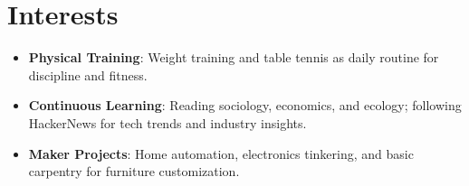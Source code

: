 \documentclass[letterpaper,11pt]{article}
\newcommand{\resumeItem}[2]{
  \item\small{
    \textbf{#1}{: #2 \vspace{-2pt}}
  }
}
\newcommand{\resumeSubItem}[2]{\resumeItem{#1}{#2}\vspace{-4pt}}
\newcommand{\resumeSubHeadingListStart}{\begin{itemize}[leftmargin=*]}
\newcommand{\resumeSubHeadingListEnd}{\end{itemize}}
\begin{document}
\section{Interests}
\resumeSubHeadingListStart
  \resumeSubItem{Physical Training}
    {Weight training and table tennis as daily routine for discipline and fitness.}
  \resumeSubItem{Continuous Learning}
    {Reading sociology, economics, and ecology; following HackerNews for tech trends and industry insights.}
  \resumeSubItem{Maker Projects}
    {Home automation, electronics tinkering, and basic carpentry for furniture customization.}
\resumeSubHeadingListEnd
\end{document}
